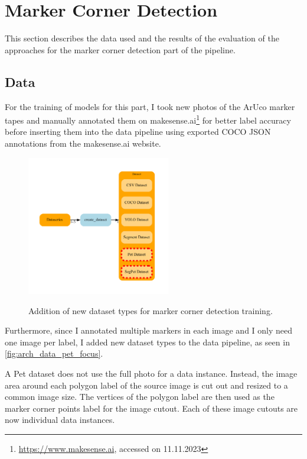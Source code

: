 \documentclass[10pt]{book}
\newcommand{\figureref}[1]{\autoref{#1}}
\begin{document}
\section{Marker Corner Detection}

This section describes the data used and the results of the evaluation of the approaches for the marker corner detection part of the pipeline.

\subsection{Data}

For the training of models for this part, I took new photos of the \ac{ArUco} marker tapes and manually annotated them on makesense.ai\footnote{\url{https://www.makesense.ai}, accessed on 11.11.2023} for better label accuracy before inserting them into the data pipeline using exported \ac{COCO} \ac{JSON} annotations from the makesense.ai website.

\begin{figure}
  \caption{Addition of new dataset types for marker corner detection training.}
  \includegraphics[width=0.56\textwidth]{graph/arch_data_pet_focus}
  \label{fig:arch_data_pet_focus}
\end{figure}

Furthermore, since I annotated multiple markers in each image and I only need one image per label, I added new dataset types to the data pipeline, as seen in \figureref{fig:arch_data_pet_focus}. 

A Pet dataset does not use the full photo for a data instance. Instead, the image area around each polygon label of the source image is cut out and resized to a common image size. The vertices of the polygon label are then used as the marker corner points label for the image cutout. Each of these image cutouts are now individual data instances.
\end{document}

